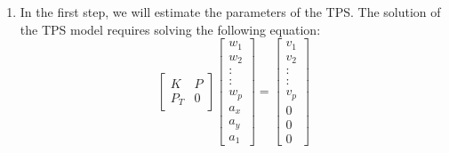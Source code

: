 \documentclass[conference]{IEEEtran}
\begin{document}
\begin{enumerate}
\item In the first step, we will estimate the parameters of the TPS. The solution of the TPS model requires solving the following equation:
\begin{equation}
\begin{bmatrix}
K & P \\
P_T & 0
\end{bmatrix}
\begin{bmatrix}
w_1\\
w_2\\
:\\
:\\
w_p\\
a_x\\
a_y\\
a_1
\end{bmatrix}
=
\begin{bmatrix}
v_1\\
v_2\\
:\\
:\\
v_p\\
0\\
0\\
0
\end{bmatrix}
\end{equation}


\end{enumerate}
\end{document}
